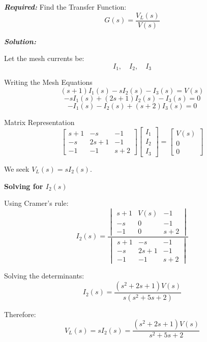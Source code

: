 \documentclass[11pt]{article}
\begin{document}
\noindent \textbf{\textit{Required:}}
Find the Transfer Function:
\[
G(s) = \frac{V_L(s)}{V(s)}
\]

\vspace{12pt}

\noindent \textbf{\textit{Solution:}}

\vspace{12pt}

{Let the mesh currents be:}
\[
I_1, \quad I_2, \quad I_3
\]

\vspace{12pt}

{Writing the Mesh Equations}
\[
(s + 1) I_1(s) - s I_2(s) - I_3(s) = V(s)
\]
\[
- s I_1(s) + (2s + 1) I_2(s) - I_3(s) = 0
\]
\[
- I_1(s) - I_2(s) + (s + 2) I_3(s) = 0
\]

{Matrix Representation}
\[
\begin{bmatrix}
s + 1 & -s & -1 \\
-s & 2s + 1 & -1 \\
-1 & -1 & s + 2
\end{bmatrix}
\begin{bmatrix}
I_1 \\ I_2 \\ I_3
\end{bmatrix}
=
\begin{bmatrix}
V(s) \\ 0 \\ 0
\end{bmatrix}
\]

We seek  \(V_L(s) = s I_2(s)\).

\vspace{1em}

\noindent\textbf{Solving for \(I_2(s)\)}

\vspace{1em}

{Using Cramer's rule:}
\[
I_2(s) = \frac{
\begin{vmatrix}
s + 1 & V(s) & -1 \\
-s & 0 & -1 \\
-1 & 0 & s + 2
\end{vmatrix}
}{
\begin{vmatrix}
s + 1 & -s & -1 \\
-s & 2s + 1 & -1 \\
-1 & -1 & s + 2
\end{vmatrix}
}
\]

Solving the determinants:
\[
I_2(s) = \frac{(s^2 + 2s + 1) V(s)}{s(s^2 + 5s + 2)}
\]

Therefore:
\[
V_L(s) = s I_2(s) = \frac{(s^2 + 2s + 1) V(s)}{s^2 + 5s + 2}
\]
\end{document}
